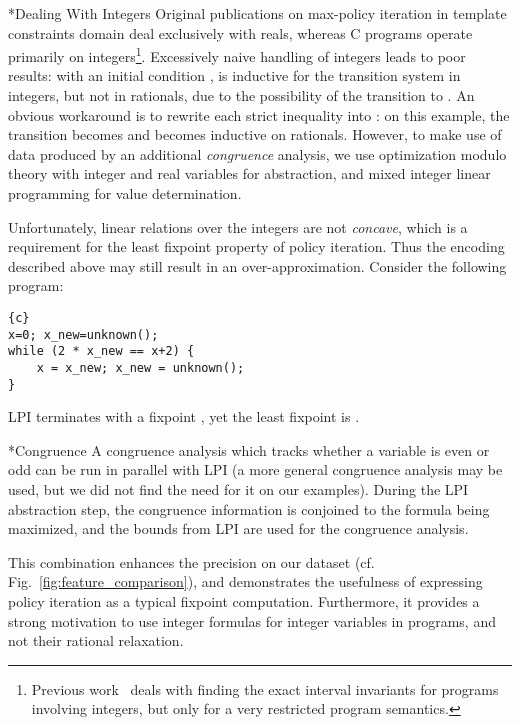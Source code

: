 \documentclass{llncs}
\makeatletter
\renewcommand{\paragraph}{\@startsection{paragraph}{4}{\z@}{0.8ex \@plus 0ex \@minus 1ex}{-1em}{\normalfont\normalsize\bfseries}}
\makeatother
\begin{document}
\paragraph*{Dealing With Integers}
Original publications on max-policy iteration in template constraints domain
deal exclusively with reals,
whereas C programs operate primarily on integers\footnote{Previous work~\cite{max_strategy_intervals_integers} deals with finding the exact
interval invariants for programs involving integers, but only for a very
restricted program semantics.}.
Excessively naive handling of integers leads to poor results:
with an initial condition ,
 is inductive for the transition system
 in integers, but not
in rationals, due to the possibility of the transition  to .
An obvious workaround is to rewrite each strict inequality  into : on this example, the transition becomes  and  becomes inductive on rationals.
However, to make use of data produced by an additional \emph{congruence} analysis,
we use optimization modulo theory with integer and real
variables  for abstraction, and mixed integer linear
programming for value determination.

Unfortunately, linear relations over the integers are not \emph{concave}, which is
a requirement for the least fixpoint property of policy iteration.
Thus the encoding described above may still result in an over-approximation.
Consider the following program:
\begin{small}
\begin{lstlisting}{c}
x=0; x_new=unknown();
while (2 * x_new == x+2) {
    x = x_new; x_new = unknown();
}
\end{lstlisting}
\end{small}
LPI terminates with a fixpoint , yet the least fixpoint is .

\paragraph*{Congruence}
A congruence analysis which tracks
whether a variable is even or odd can be run in parallel with LPI
(a more general congruence analysis may be used, but we did not find the need for it on our examples).
During the LPI abstraction step, the congruence information is conjoined to the formula being maximized,
and the bounds from LPI are used for the congruence analysis.

This combination enhances the precision on our dataset
(cf. Fig.~\ref{fig:feature_comparison}), and demonstrates the usefulness of
expressing policy iteration as a typical fixpoint computation.
Furthermore, it provides a strong motivation to use integer formulas for
integer variables in programs, and not their rational relaxation.
\end{document}
